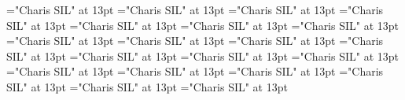 \documentclass[a4paper]{article}
\begin{document}
\font\spanenspanspanspansensespanentryletDatadicBody="Charis SIL" at 13pt
\font\translationLdtespanspansensespanentryletDatadicBody="Charis SIL" at 13pt
\font\spantetranslationLdtespanspansensespanentryletDatadicBody="Charis SIL" at 13pt
\font\spanentranslationLdtespanspansensespanentryletDatadicBody="Charis SIL" at 13pt
\font\spanenspansensespanentryletDatadicBody="Charis SIL" at 13pt
\font\semanticdomainabbrenspansensespanentryletDatadicBody="Charis SIL" at 13pt
\font\spanensemanticdomainabbrenspansensespanentryletDatadicBody="Charis SIL" at 13pt
\font\semanticdomainnameenspansensespanentryletDatadicBody="Charis SIL" at 13pt
\font\spanensemanticdomainnameenspansensespanentryletDatadicBody="Charis SIL" at 13pt
\font{}="Charis SIL" at 13pt
\font\xitemendefinitionLdensensespanentryletDatadicBody="Charis SIL" at 13pt
\font\spanenxitemendefinitionLdensensespanentryletDatadicBody="Charis SIL" at 13pt
\font\spanendefinitionLdensensespanentryletDatadicBody="Charis SIL" at 13pt
\font\xitemtedefinitionLdensensespanentryletDatadicBody="Charis SIL" at 13pt
\font\spantexitemtedefinitionLdensensespanentryletDatadicBody="Charis SIL" at 13pt
\font\LexSensepublishStemGlossPubLdensensespanentryletDatadicBody="Charis SIL" at 13pt
\font\xitemenLexSensepublishStemGlossPubLdensensespanentryletDatadicBody="Charis SIL" at 13pt
\font\spanenxitemenLexSensepublishStemGlossPubLdensensespanentryletDatadicBody="Charis SIL" at 13pt
\font\xitemteLexSensepublishStemGlossPubLdensensespanentryletDatadicBody="Charis SIL" at 13pt
\font\spantexitemteLexSensepublishStemGlossPubLdensensespanentryletDatadicBody="Charis SIL" at 13pt
\end{document}
